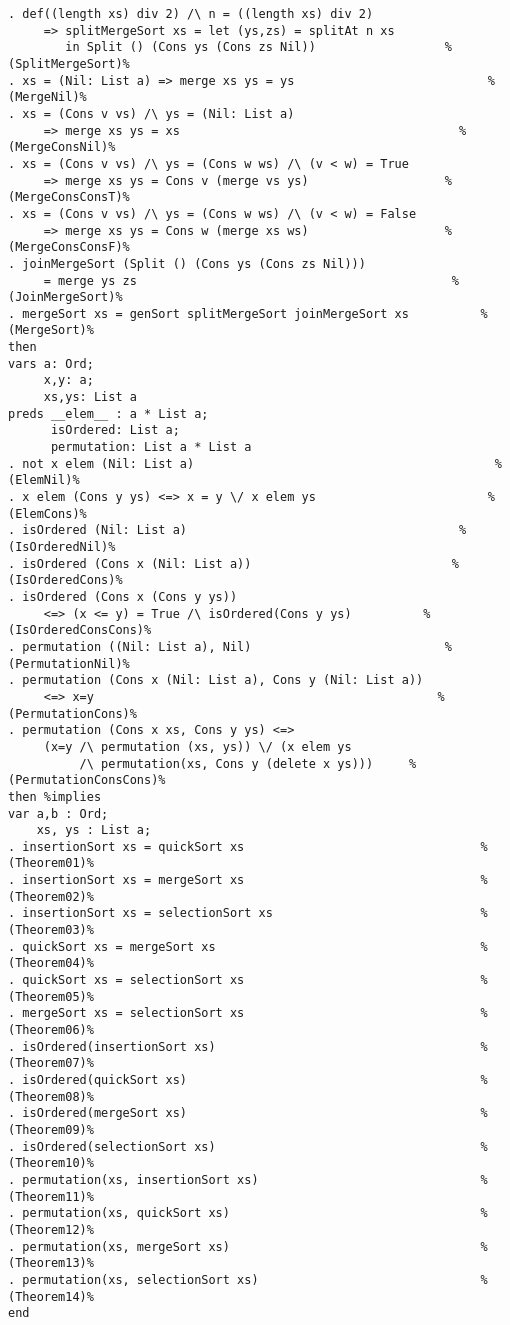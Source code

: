 \begin{Verbatim}
. def((length xs) div 2) /\ n = ((length xs) div 2) 
     => splitMergeSort xs = let (ys,zs) = splitAt n xs
        in Split () (Cons ys (Cons zs Nil))                  %(SplitMergeSort)%
. xs = (Nil: List a) => merge xs ys = ys                           %(MergeNil)%
. xs = (Cons v vs) /\ ys = (Nil: List a) 
     => merge xs ys = xs                                       %(MergeConsNil)%
. xs = (Cons v vs) /\ ys = (Cons w ws) /\ (v < w) = True 
     => merge xs ys = Cons v (merge vs ys)                   %(MergeConsConsT)%
. xs = (Cons v vs) /\ ys = (Cons w ws) /\ (v < w) = False 
     => merge xs ys = Cons w (merge xs ws)                   %(MergeConsConsF)%
. joinMergeSort (Split () (Cons ys (Cons zs Nil))) 
     = merge ys zs                                            %(JoinMergeSort)%
. mergeSort xs = genSort splitMergeSort joinMergeSort xs          %(MergeSort)%
then
vars a: Ord;
     x,y: a;
     xs,ys: List a
preds __elem__ : a * List a;
      isOrdered: List a;
      permutation: List a * List a
. not x elem (Nil: List a)                                          %(ElemNil)%
. x elem (Cons y ys) <=> x = y \/ x elem ys                        %(ElemCons)%
. isOrdered (Nil: List a)                                      %(IsOrderedNil)%
. isOrdered (Cons x (Nil: List a))                            %(IsOrderedCons)%
. isOrdered (Cons x (Cons y ys)) 
     <=> (x <= y) = True /\ isOrdered(Cons y ys)          %(IsOrderedConsCons)%
. permutation ((Nil: List a), Nil)                           %(PermutationNil)%
. permutation (Cons x (Nil: List a), Cons y (Nil: List a))
     <=> x=y                                                %(PermutationCons)%
. permutation (Cons x xs, Cons y ys) <=>
     (x=y /\ permutation (xs, ys)) \/ (x elem ys
          /\ permutation(xs, Cons y (delete x ys)))     %(PermutationConsCons)%
then %implies
var a,b : Ord;
    xs, ys : List a;
. insertionSort xs = quickSort xs                                 %(Theorem01)%
. insertionSort xs = mergeSort xs                                 %(Theorem02)%
. insertionSort xs = selectionSort xs                             %(Theorem03)%
. quickSort xs = mergeSort xs                                     %(Theorem04)%
. quickSort xs = selectionSort xs                                 %(Theorem05)%
. mergeSort xs = selectionSort xs                                 %(Theorem06)%
. isOrdered(insertionSort xs)                                     %(Theorem07)%
. isOrdered(quickSort xs)                                         %(Theorem08)%
. isOrdered(mergeSort xs)                                         %(Theorem09)%
. isOrdered(selectionSort xs)                                     %(Theorem10)%
. permutation(xs, insertionSort xs)                               %(Theorem11)%
. permutation(xs, quickSort xs)                                   %(Theorem12)%
. permutation(xs, mergeSort xs)                                   %(Theorem13)%
. permutation(xs, selectionSort xs)                               %(Theorem14)%
end
\end{Verbatim}